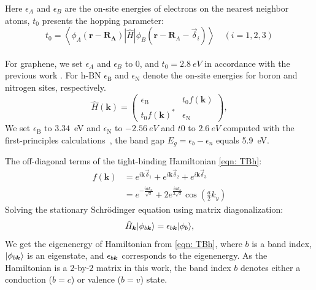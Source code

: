 Here $\epsilon_{A}$ and $\epsilon_{B}$ are the on-site energies of electrons on the nearest neighbor atoms, $t_0$ presents the hopping parameter:
$$
t_{0}=\left\langle\phi_{A}\left(\mathbf{r}-\mathbf{R}_{\mathbf{A}}\right)|\hat{H}| \phi_{B}\left(\mathbf{r}-\mathbf{R}_{A}-\vec{\delta}_{i}\right)\right\rangle \quad(i=1,2,3)
$$\\
For graphene, we set $\epsilon_{A}$ and $\epsilon_{B}$ to 0, and $t_0=2.8~eV$ in accordance with the previous work  \cite{sarma2011electronic}. For h-BN $\epsilon_{\mathrm{B}}$ and $\epsilon_{\mathrm{N}}$ denote the on-site energies for boron and nitrogen sites, respectively. 
\begin{equation}
\hat{H}(\mathbf{k})=\left(\begin{array}{cc}
\epsilon_{\mathrm{B}} & t_{0} f(\mathbf{k}) \\
t_{0} f(\mathbf{k})^{*} & \epsilon_{\mathrm{N}}
\end{array}\right),
\label{eqn:hBNhamiltonian}
\end{equation}
We set $\epsilon_{\mathrm{B}}$ to $3.34$~eV and $\epsilon_{\mathrm{N}}$ to $-2.56~eV$ and $t0$ to $2.6~eV$ computed with the first-principles calculations~\cite{PhysRevB.51.6868}, the band gap $E_{g}=\epsilon_{b}-\epsilon_{n}$ equals 5.9~eV. 

The off-diagonal terms of the tight-binding Hamiltonian \ref{eqn: TBh}:
\begin{equation}
 \begin{aligned}
f(\mathbf{k}) &=e^{i \mathbf{k} \vec{\delta}_{1}}+e^{i \mathbf{k} \vec{\delta}_{2}}+e^{i \mathbf{k} \vec{\delta}_{3}} \\
&=e^{-\frac{i a k_{x}}{\sqrt{3}}}+2 e^{\frac{i a k_{x}}{2 \sqrt{3}}} \cos \left(\frac{a}{2} k_{y}\right)
\end{aligned}
\label{eqn:nearest_h}
\end{equation}
Solving the stationary Schrödinger equation using matrix diagonalization:
\begin{align}
\hat{H}_{\boldsymbol{k}}|\phi_{b \boldsymbol{k}}\rangle = \epsilon_{b\boldsymbol{k}}|\phi_{b}\rangle,
\label{eq:eqigenstates-h0}
\end{align}
We get the eigenenergy of Hamiltonian from \ref{eqn: TBh}, where $b$ is a band index, $|\phi_{b\boldsymbol{k}}\rangle$ is an eigenstate, and $\epsilon_{b\boldsymbol{k}}$ corresponds to the eigenenergy. As the Hamiltonian is a $2$-by-$2$ matrix in this work, the band index $b$ denotes either a conduction ($b=c$) or valence ($b=v$) state.

